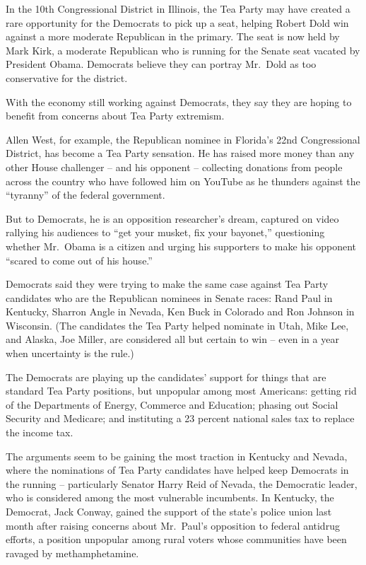 ﻿\documentclass[12pt]{article}
\begin{document}
In the 10th Congressional District in Illinois, the Tea Party may have created a rare opportunity
for the Democrats to pick up a seat, helping Robert Dold win against a more moderate Republican in
the primary. The seat is now held by Mark Kirk, a moderate Republican who is running for the Senate
seat vacated by President Obama. Democrats believe they can portray Mr.~Dold as too conservative for
the district.

With the economy still working against Democrats, they say they are hoping to benefit from concerns
about Tea Party extremism.

Allen West, for example, the Republican nominee in Florida's 22nd Congressional District, has become
a Tea Party sensation. He has raised more money than any other House challenger -- and his opponent
-- collecting donations from people across the country who have followed him on YouTube as he
thunders against the ``tyranny'' of the federal government.

But to Democrats, he is an opposition researcher's dream, captured on video rallying his audiences
to ``get your musket, fix your bayonet,'' questioning whether Mr.~Obama is a citizen and urging his
supporters to make his opponent ``scared to come out of his house.''

Democrats said they were trying to make the same case against Tea Party candidates who are the
Republican nominees in Senate races: Rand Paul in Kentucky, Sharron Angle in Nevada, Ken Buck in
Colorado and Ron Johnson in Wisconsin. (The candidates the Tea Party helped nominate in Utah, Mike
Lee, and Alaska, Joe Miller, are considered all but certain to win -- even in a year when
uncertainty is the rule.)

The Democrats are playing up the candidates' support for things that are standard Tea Party
positions, but unpopular among most Americans: getting rid of the Departments of Energy, Commerce
and Education; phasing out Social Security and Medicare; and instituting a 23 percent national sales
tax to replace the income tax.

The arguments seem to be gaining the most traction in Kentucky and Nevada, where the nominations of
Tea Party candidates have helped keep Democrats in the running -- particularly Senator Harry Reid of
Nevada, the Democratic leader, who is considered among the most vulnerable incumbents. In Kentucky,
the Democrat, Jack Conway, gained the support of the state's police union last month after raising
concerns about Mr.~Paul's opposition to federal antidrug efforts, a position unpopular among rural
voters whose communities have been ravaged by methamphetamine.
\end{document}
